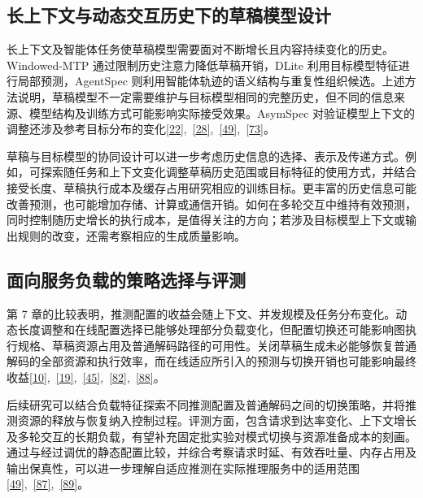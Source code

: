 \documentclass[11pt,a4paper,UTF8,fontset=none,scheme=plain,zihao=-4]{ctexart}
\begin{document}
\hypertarget{section-8-5}{%
\subsection{长上下文与动态交互历史下的草稿模型设计}\label{section-8-5}}

长上下文及智能体任务使草稿模型需要面对不断增长且内容持续变化的历史。Windowed-MTP
通过限制历史注意力降低草稿开销，DLite
利用目标模型特征进行局部预测，AgentSpec
则利用智能体轨迹的语义结构与重复性组织候选。上述方法说明，草稿模型不一定需要维护与目标模型相同的完整历史，但不同的信息来源、模型结构及训练方式可能影响实际接受效果。AsymSpec
对验证模型上下文的调整还涉及参考目标分布的变化\protect\hyperlink{ref-windowedmtp}{{[}22{]}},~\protect\hyperlink{ref-dlite}{{[}28{]}},~\protect\hyperlink{ref-agentspec}{{[}49{]}},~\protect\hyperlink{ref-asymspec}{{[}73{]}}。

草稿与目标模型的协同设计可以进一步考虑历史信息的选择、表示及传递方式。例如，可探索随任务和上下文变化调整草稿历史范围或目标特征的使用方式，并结合接受长度、草稿执行成本及缓存占用研究相应的训练目标。更丰富的历史信息可能改善预测，也可能增加存储、计算或通信开销。如何在多轮交互中维持有效预测，同时控制随历史增长的执行成本，是值得关注的方向；若涉及目标模型上下文或输出规则的改变，还需考察相应的生成质量影响。

\hypertarget{section-8-6}{%
\subsection{面向服务负载的策略选择与评测}\label{section-8-6}}

第 7
章的比较表明，推测配置的收益会随上下文、并发规模及任务分布变化。动态长度调整和在线配置选择已能够处理部分负载变化，但配置切换还可能影响图执行规格、草稿资源占用及普通解码路径的可用性。关闭草稿生成未必能够恢复普通解码的全部资源和执行效率，而在线适应所引入的预测与切换开销也可能影响最终收益\protect\hyperlink{ref-smartspec}{{[}10{]}},~\protect\hyperlink{ref-sglstepzero}{{[}19{]}},~\protect\hyperlink{ref-banditspec}{{[}45{]}},~\protect\hyperlink{ref-trtllmspec}{{[}82{]}},~\protect\hyperlink{ref-servinglatencymodel}{{[}88{]}}。

后续研究可以结合负载特征探索不同推测配置及普通解码之间的切换策略，并将推测资源的释放与恢复纳入控制过程。评测方面，包含请求到达率变化、上下文增长及多轮交互的长期负载，有望补充固定批实验对模式切换与资源准备成本的刻画。通过与经过调优的静态配置比较，并综合考察请求时延、有效吞吐量、内存占用及输出保真性，可以进一步理解自适应推测在实际推理服务中的适用范围\protect\hyperlink{ref-agentspec}{{[}49{]}},~\protect\hyperlink{ref-illusion}{{[}87{]}},~\protect\hyperlink{ref-speedbench}{{[}89{]}}。
\end{document}
